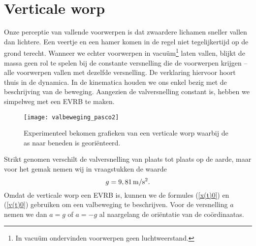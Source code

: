 \documentclass{ximera}
\begin{document}
	\author{Bart Lambregs}
    \xmsource


	\section{Verticale worp}

	Onze perceptie van vallende voorwerpen is dat zwaardere lichamen sneller vallen dan lichtere. Een veertje en een hamer komen in de regel niet tegelij\-ker\-tijd op de grond terecht. Wanneer we echter voorwerpen in vacu\"um\footnote{In vacu\"um ondervinden voorwerpen geen luchtweerstand.} laten vallen, blijkt de massa geen rol te spelen bij de constante versnelling die de voorwerpen krijgen -- alle voorwerpen vallen met dezelfde versnelling. De verklaring hiervoor hoort thuis in de dynamica. In de kinematica houden we ons enkel bezig met de beschrijving van de beweging. Aangezien de valversnelling constant is, hebben we simpelweg met een EVRB te maken.
	\begin{figure}[h]
	\centering
	\texttt{[image: valbeweging\_pasco2]}
	\caption{Experimenteel bekomen grafieken van een verticale worp waarbij de as naar beneden is geori\"enteerd.}
	\end{figure}
	Strikt genomen verschilt de valversnelling van plaats tot plaats op de aarde, maar voor het gemak nemen wij in vraagstukken de waarde
	\[g=9,81\rm\,m/s^2.\]
	Omdat de verticale worp een EVRB is, kunnen we de formules (\ref{x(t)0}) en (\ref{v(t)0}) gebruiken om een valbeweging te beschrijven. Voor de versnelling $a$ nemen we dan $a=g$ of $a=-g$ al naargelang de ori\"entatie van de co\"ordinaatas.
	
	\clearpage
	
\end{document}
